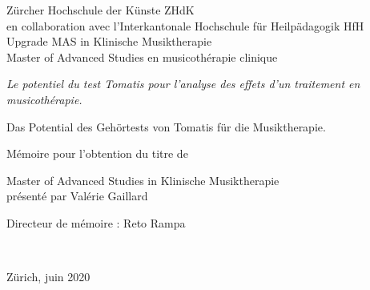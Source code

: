 
\begin{titlepage}
 \begin{center}
    \Large
     Zürcher Hochschule der Künste ZHdK\\
 	en collaboration avec l'Interkantonale Hochschule für
        Heilpädagogik HfH \\
	 Upgrade MAS in Klinische Musiktherapie \\ Master of Advanced Studies en musicothérapie clinique\\
  \vfill
  { \LARGE
\emph{Le potentiel du test Tomatis pour l'analyse des effets d'un traitement en musicothérapie.}\\ \bigskip


Das Potential des Gehörtests von Tomatis für die Musiktherapie.}
 \vfill

Mémoire pour l'obtention du titre de

Master of Advanced Studies in Klinische Musiktherapie \\ présenté par Valérie Gaillard

{\large Directeur de mémoire : Reto Rampa}



	 \hfill \\
	 \rule{0mm}{1pt} \hfill
{\large Zürich, juin 2020}
 \end{center}
\end{titlepage}
